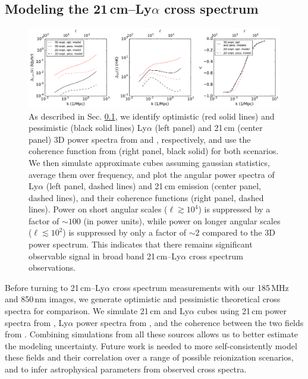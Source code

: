 \documentclass[numberedappendix]{emulateapj}
\begin{document}
\subsection{Modeling the 21\,cm--Ly$\alpha$ cross spectrum}
\label{sec:modelingthecrossspectrum}

\begin{figure}[h]
\centering
\includegraphics[width=7in]{spectra3D_to_2D.pdf}
\caption[Study of the relationship between power spectra recovered from 2D and 3D surveys, both for 21\,cm and 850\,nm cubes.]{As described in Sec. \ref{sec:modelingthecrossspectrum}, we identify optimistic (red solid lines) and pessimistic (black solid lines) Ly$\alpha$ (left panel) and 21\,cm (center panel) 3D power spectra from \citet{Gong2014} and \citet{PoberNextGen}, respectively, and use the coherence function from \citet{Heneka2016} (right panel, black solid) for both scenarios. We then simulate approximate cubes assuming gaussian statistics, average them over frequency, and plot the angular power spectra of Ly$\alpha$ (left panel, dashed lines) and 21\,cm emission (center panel, dashed lines), and their coherence functions (right panel, dashed lines). Power on short angular scales ($\ell\gtrsim10^4$) is suppressed by a factor of $\sim100$ (in power units), while power on longer angular scales ($\ell\lesssim10^2$) is suppressed by only a factor of $\sim2$ compared to the 3D power spectrum. This indicates that there remains significant observable signal in broad band 21\,cm--Ly$\alpha$ cross spectrum observations. }
\label{fig:spectra3Dto2D}
\end{figure}

Before turning to 21\,cm--Ly$\alpha$ cross spectrum measurements with our 185\,MHz and 850\,nm images, we generate optimistic and pessimistic theoretical cross spectra for comparison. We simulate 21\,cm and Ly$\alpha$ cubes using 21\,cm power spectra from \citet{PoberNextGen}, Ly$\alpha$ power spectra from \citet{Gong2014}, and the coherence between the two fields from \citet{Heneka2016}. Combining simulations from all these sources allows us to better estimate the modeling uncertainty. Future work is needed to more self-consistently model these fields and their correlation over a range of possible reionization scenarios, and to infer astrophysical parameters from observed cross spectra.
\end{document}
